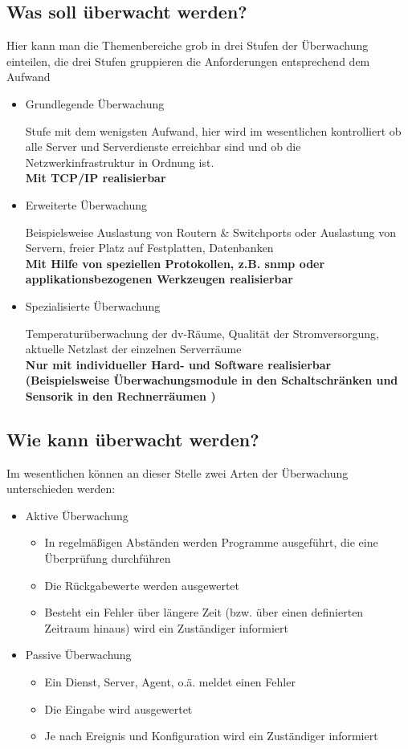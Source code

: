 \documentclass[12pt,a4paper,parskip]{scrreprt}
\begin{document}
	\subsection{Was soll überwacht werden?}
	Hier kann man die Themenbereiche grob in drei Stufen der Überwachung einteilen, die drei Stufen gruppieren die Anforderungen entsprechend dem Aufwand
	\begin{itemize}
		\item Grundlegende Überwachung
		
		Stufe mit dem wenigsten Aufwand, hier wird im wesentlichen kontrolliert ob alle Server und Serverdienste erreichbar sind und ob die Netzwerkinfrastruktur in Ordnung ist.\\
		\textbf{Mit TCP/IP realisierbar}
		\item Erweiterte Überwachung
		
		Beispielsweise Auslastung von Routern \& Switchports oder Auslastung von Servern, freier Platz auf Festplatten, Datenbanken\\
		\textbf{Mit Hilfe von speziellen Protokollen, z.B. \acrshort{snmp} oder applikationsbezogenen Werkzeugen realisierbar}
		\item Spezialisierte Überwachung
		
		Temperaturüberwachung der \acrshort{dv}-Räume, Qualität der Stromversorgung, aktuelle Netzlast der einzelnen Serverräume\\
		\textbf{Nur mit individueller Hard- und Software realisierbar (Beispielsweise Überwachungsmodule in den Schaltschränken und Sensorik in den Rechnerräumen )}
	\end{itemize}
	\subsection{Wie kann überwacht werden?}
	Im wesentlichen können an dieser Stelle zwei Arten der Überwachung unterschieden werden:
	\begin{itemize}
		\item Aktive Überwachung
		\begin{itemize}
		\item In regelmäßigen Abständen werden Programme ausgeführt, die eine Überprüfung durchführen
		\item Die Rückgabewerte werden ausgewertet
		\item Besteht ein Fehler über längere Zeit (bzw. über einen definierten Zeitraum hinaus) wird ein Zuständiger informiert
		\end{itemize}
		\item Passive Überwachung
		\begin{itemize}
			\item Ein Dienst, Server, Agent, o.ä. meldet einen Fehler
			\item Die Eingabe wird ausgewertet
			\item Je nach Ereignis und Konfiguration wird ein Zuständiger informiert
		\end{itemize}
	\end{itemize}
\end{document}

